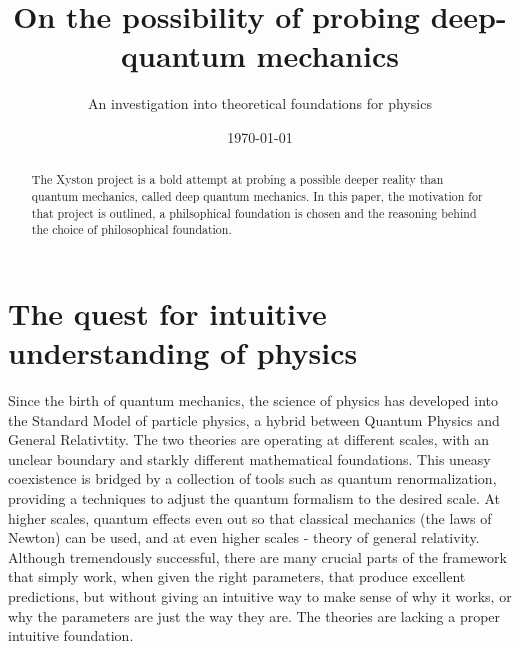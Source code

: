 \documentclass[notitlepage]{report}
\title{On the possibility of probing deep-quantum mechanics}
\author{An investigation into theoretical foundations for physics}
\date{\today}
\begin{document}
\maketitle
\thispagestyle{empty}

\begin{abstract}
The Xyston project is a bold attempt at probing a possible deeper reality than quantum mechanics, called deep quantum mechanics. In this paper, the motivation for that project is outlined, a philsophical foundation is chosen and the reasoning behind the choice of philosophical foundation. 
\end{abstract}



\section*{The quest for intuitive understanding of physics}
Since the birth of quantum mechanics, the science of physics has developed into the Standard Model of particle physics, a hybrid between Quantum Physics and General Relativtity. The two theories are operating at different scales, with an unclear boundary and starkly different mathematical foundations. This uneasy coexistence is bridged by a collection of tools such as quantum renormalization, providing a techniques to adjust the quantum formalism to the desired scale. At higher scales, quantum effects even out so that classical mechanics (the laws of Newton) can be used, and at even higher scales - theory of general relativity. Although tremendously successful, there are many crucial parts of the framework that simply work, when given the right parameters, that produce excellent predictions, but without giving an intuitive way to make sense of why it works, or why the parameters are just the way they are. The theories are lacking a proper intuitive foundation.
\end{document}
